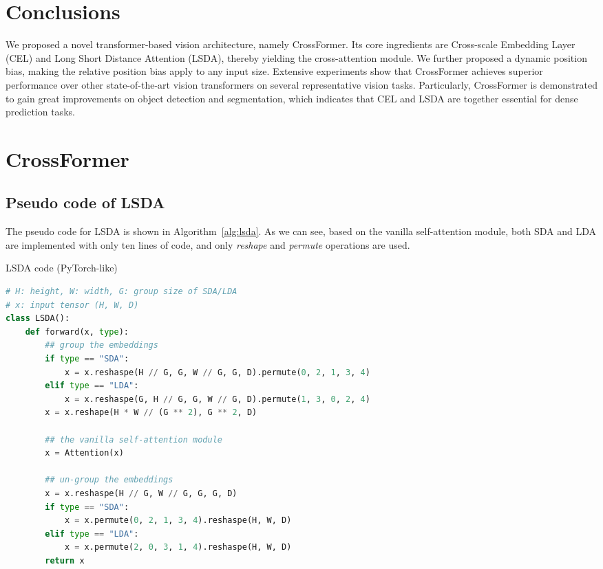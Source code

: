\documentclass{article} \usepackage{iclr2022_conference,times}
\begin{document}
\vspace{-3mm}
\section{Conclusions}
\vspace{-2mm}


We proposed a novel transformer-based vision architecture, namely CrossFormer. Its core ingredients are Cross-scale Embedding Layer (CEL) and Long Short Distance Attention (LSDA), thereby yielding the cross-attention module. We further proposed a dynamic position bias, making the relative position bias apply to any input size. Extensive experiments show that CrossFormer achieves superior performance over other state-of-the-art vision transformers on several representative vision tasks. Particularly, CrossFormer is demonstrated to gain great improvements on object detection and segmentation, which indicates that CEL and LSDA are together essential for dense prediction tasks.
    
    


\newpage

\appendix
\section{CrossFormer}

\subsection{Pseudo code of LSDA} \label{apd:pesudo}
The pseudo code for LSDA is shown in Algorithm~\ref{alg:lsda}. As we can see, based on the vanilla self-attention module, both SDA and LDA are implemented with only ten lines of code, and only \textit{reshape} and \textit{permute} operations are used.
\begin{algorithm}[]
\caption{{LSDA code (PyTorch-like)}}
\label{alg:lsda}
\begin{lstlisting}[language=python]
# H: height, W: width, G: group size of SDA/LDA
# x: input tensor (H, W, D)
class LSDA():  
    def forward(x, type):
        ## group the embeddings
        if type == "SDA":
            x = x.reshaspe(H // G, G, W // G, G, D).permute(0, 2, 1, 3, 4)
        elif type == "LDA":
            x = x.reshaspe(G, H // G, G, W // G, D).permute(1, 3, 0, 2, 4)
        x = x.reshape(H * W // (G ** 2), G ** 2, D)
    
        ## the vanilla self-attention module
        x = Attention(x)
    
        ## un-group the embeddings
        x = x.reshaspe(H // G, W // G, G, G, D)
        if type == "SDA":
            x = x.permute(0, 2, 1, 3, 4).reshaspe(H, W, D)
        elif type == "LDA":
            x = x.permute(2, 0, 3, 1, 4).reshaspe(H, W, D)
        return x
\end{lstlisting}
\end{algorithm}
    
\end{document}
